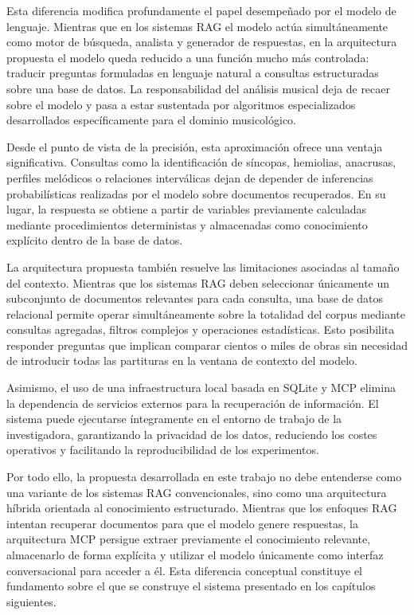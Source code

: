 Esta diferencia modifica profundamente el papel desempeñado por el modelo de lenguaje. Mientras que en los sistemas RAG el modelo actúa simultáneamente como motor de búsqueda, analista y generador de respuestas, en la arquitectura propuesta el modelo queda reducido a una función mucho más controlada: traducir preguntas formuladas en lenguaje natural a consultas estructuradas sobre una base de datos. La responsabilidad del análisis musical deja de recaer sobre el modelo y pasa a estar sustentada por algoritmos especializados desarrollados específicamente para el dominio musicológico.

Desde el punto de vista de la precisión, esta aproximación ofrece una ventaja significativa. Consultas como la identificación de síncopas, hemiolias, anacrusas, perfiles melódicos o relaciones interválicas dejan de depender de inferencias probabilísticas realizadas por el modelo sobre documentos recuperados. En su lugar, la respuesta se obtiene a partir de variables previamente calculadas mediante procedimientos deterministas y almacenadas como conocimiento explícito dentro de la base de datos.

La arquitectura propuesta también resuelve las limitaciones asociadas al tamaño del contexto. Mientras que los sistemas RAG deben seleccionar únicamente un subconjunto de documentos relevantes para cada consulta, una base de datos relacional permite operar simultáneamente sobre la totalidad del corpus mediante consultas agregadas, filtros complejos y operaciones estadísticas. Esto posibilita responder preguntas que implican comparar cientos o miles de obras sin necesidad de introducir todas las partituras en la ventana de contexto del modelo.

Asimismo, el uso de una infraestructura local basada en SQLite y MCP elimina la dependencia de servicios externos para la recuperación de información. El sistema puede ejecutarse íntegramente en el entorno de trabajo de la investigadora, garantizando la privacidad de los datos, reduciendo los costes operativos y facilitando la reproducibilidad de los experimentos.

Por todo ello, la propuesta desarrollada en este trabajo no debe entenderse como una variante de los sistemas RAG convencionales, sino como una arquitectura híbrida orientada al conocimiento estructurado. Mientras que los enfoques RAG intentan recuperar documentos para que el modelo genere respuestas, la arquitectura MCP persigue extraer previamente el conocimiento relevante, almacenarlo de forma explícita y utilizar el modelo únicamente como interfaz conversacional para acceder a él. Esta diferencia conceptual constituye el fundamento sobre el que se construye el sistema presentado en los capítulos siguientes.